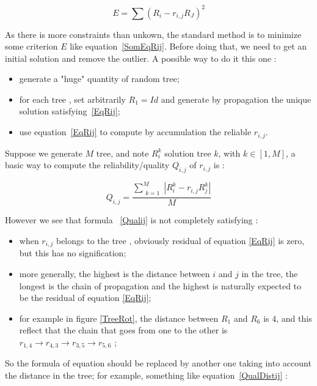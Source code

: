 \documentclass[a4paper]{article}
\begin{document}
\begin{equation}
   E= \sum (R_i - r_{i,j} R_J)^2 \label{SomEqRij}
\end{equation}

As there is more constraints than unkown, the standard method is to minimize some
criterion $E$ like equation~\ref{SomEqRij}. Before doing that,
we need to get an initial solution and remove the outlier. A 
possible way to do it this one :

\begin{itemize}
   \item  generate a "huge" quantity of random tree;
   \item  for each tree , set arbitrarily $R_1=Id$ and generate by propagation
          the unique solution satisfying~\ref{EqRij};
   \item  use equation~\ref{EqRij} to compute by accumulation the reliable $r_{i,j}$.
\end{itemize}


Suppose we generate $M$ tree, and note $R^k_i$ solution tree $k$, with $k \in [1,M]$,
a basic way to compute the reliability/quality $Q_{i,j}$ of $r_{i,j}$ is :

\begin{equation}
   Q_{i,j} = \frac{\sum\limits_{\substack{k=1 }}^{M}  |R^k_i - r_{i,j} R^k_j|}{M} \label{Qualij}
\end{equation}


However we see that formula ~\ref{Qualij} is not completely satisfying :

\begin{itemize}
   \item  when $r_{i,j}$ belongs to the tree , obviously residual of equation \ref{EqRij}
          is zero, but this has no signification;

   \item  more generally, the highest is the distance between $i$ and $j$ in the tree,
          the longest is the chain of propagation and the highest is naturally expected
          to be the residual of equation \ref{EqRij};

   \item for example in figure \ref{TreeRot}, the distance between $R_1$ and $R_6$ is
         $4$, and this reflect that the chain that goes from one to the other is
         $r_{1,4} \rightarrow r_{4,3} \rightarrow  r_{3,5} \rightarrow r_{5,6}$ ;
\end{itemize}

So the formula of equation should be replaced by another one taking into account
the distance in the tree; for example, something like equation~\ref{QualDistij}  :
\end{document}
